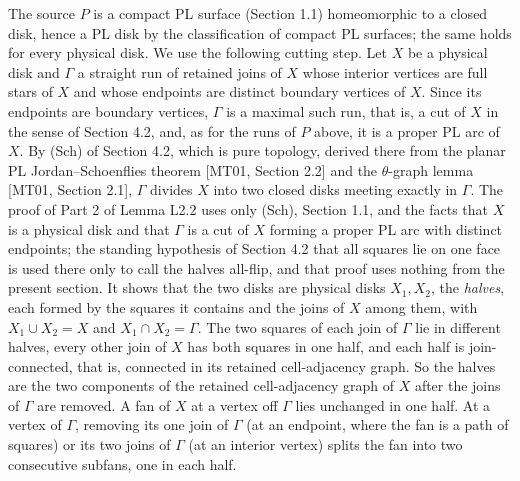 \documentclass[
  11pt,
]{article}
\begin{document}
The source \(P\) is a compact PL surface (Section 1.1) homeomorphic to a
closed disk, hence a PL disk by the classification of compact PL
surfaces; the same holds for every physical disk. We use the following
cutting step. Let \(X\) be a physical disk and \(\Gamma\) a straight run
of retained joins of \(X\) whose interior vertices are full stars of
\(X\) and whose endpoints are distinct boundary vertices of \(X\). Since
its endpoints are boundary vertices, \(\Gamma\) is a maximal such run,
that is, a cut of \(X\) in the sense of Section 4.2, and, as for the
runs of \(P\) above, it is a proper PL arc of \(X\). By (Sch) of Section
4.2, which is pure topology, derived there from the planar PL
Jordan--Schoenflies theorem {[}MT01, Section 2.2{]} and the
\(\theta\)-graph lemma {[}MT01, Section 2.1{]}, \(\Gamma\) divides \(X\)
into two closed disks meeting exactly in \(\Gamma\). The proof of Part 2
of Lemma L2.2 uses only (Sch), Section 1.1, and the facts that \(X\) is
a physical disk and that \(\Gamma\) is a cut of \(X\) forming a proper
PL arc with distinct endpoints; the standing hypothesis of Section 4.2
that all squares lie on one face is used there only to call the halves
all-flip, and that proof uses nothing from the present section. It shows
that the two disks are physical disks \(X_1,X_2\), the \emph{halves},
each formed by the squares it contains and the joins of \(X\) among
them, with \(X_1\cup X_2=X\) and \(X_1\cap X_2=\Gamma\). The two squares
of each join of \(\Gamma\) lie in different halves, every other join of
\(X\) has both squares in one half, and each half is join-connected,
that is, connected in its retained cell-adjacency graph. So the halves
are the two components of the retained cell-adjacency graph of \(X\)
after the joins of \(\Gamma\) are removed. A fan of \(X\) at a vertex
off \(\Gamma\) lies unchanged in one half. At a vertex of \(\Gamma\),
removing its one join of \(\Gamma\) (at an endpoint, where the fan is a
path of squares) or its two joins of \(\Gamma\) (at an interior vertex)
splits the fan into two consecutive subfans, one in each half.
\end{document}
